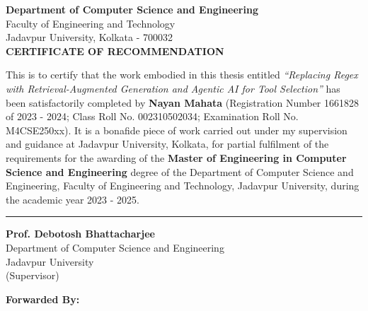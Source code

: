 
\thispagestyle{empty}
\begin{center}

\begin{center}
    \large \textbf{Department of Computer Science and Engineering} \\
    \large Faculty of Engineering and Technology \\
    \large Jadavpur University, Kolkata - 700032 \\

    \vspace{1cm}
    \LARGE \textbf{CERTIFICATE OF RECOMMENDATION}
\end{center}

\vspace{1cm}
\end{center}

\vspace{0.2cm}

\noindent
\setlength{\baselineskip}{1.2\baselineskip}
This is to certify that the work embodied in this thesis entitled \textit{``Replacing Regex with Retrieval-Augmented Generation and Agentic AI for Tool Selection''} has been satisfactorily completed by \textbf{Nayan Mahata} (Registration Number 1661828 of 2023 - 2024; Class Roll No. 002310502034; Examination Roll No. M4CSE250xx). It is a bonafide piece of work carried out under my supervision and guidance at Jadavpur University, Kolkata, for partial fulfilment of the requirements for the awarding of the \textbf{Master of Engineering in Computer Science and Engineering} degree of the Department of Computer Science and Engineering, Faculty of Engineering and Technology, Jadavpur University, during the academic year 2023 - 2025.

\vspace{1.cm}
\hfill \rule{7cm}{0.4pt}
\begin{flushright}
\noindent
\textbf{Prof. Debotosh Bhattacharjee} \\
Department of Computer Science and Engineering \\
Jadavpur University \\
(Supervisor)
\end{flushright}

\vspace{1cm}

\noindent
\textbf{Forwarded By:}

